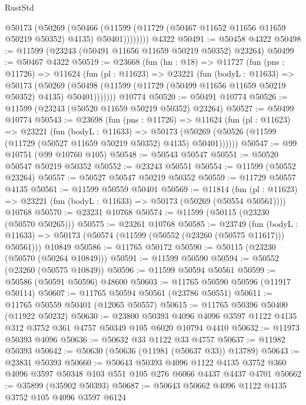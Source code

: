 \begin{lexlean}{RustStd}
\begin{coremodule}
            @50173
              (@50269
                (@50466
                  (@11599 (@11729 (@50467 @11652 @11656 @11659 @50219 @50352) @4135) @50401))))))))
    @4322
@50491 := @50458 @4322
@50498 := @11599 (@23243 (@50491 @11656 @11659 @50219 @50352) @23264)
@50499 := @50467 @4322
@50519 := @23668
    (fun (hn : @18) =>
    @11727
      (fun (pns : @11726) =>
      @11624
        (fun (pl : @11623) =>
        @23221
          (fun (bodyL : @11633) =>
          @50173
            (@50269
              (@50498 (@11599 (@11729 (@50499 @11656 @11659 @50219 @50352) @4135) @50401)))))))
    @10774
@50520 := @50491 @10774
@50526 := @11599 (@23243 (@50520 @11659 @50219 @50352) @23264)
@50527 := @50499 @10774
@50543 := @23698
    (fun (pns : @11726) =>
    @11624
      (fun (pl : @11623) =>
      @23221
        (fun (bodyL : @11633) =>
        @50173 (@50269 (@50526 (@11599 (@11729 (@50527 @11659 @50219 @50352) @4135) @50401))))))
@50547 := @99 @10751 (@99 @10760 @105)
@50548 := @50543 @50547
@50551 := @50520 @50547 @50219 @50352
@50552 := @23243 @50551
@50554 := @11599 (@50552 @23264)
@50557 := @50527 @50547 @50219 @50352
@50559 := @11729 @50557 @4135
@50561 := @11599 @50559 @50401
@50569 := @11814
    (fun (pl : @11623) => @23221 (fun (bodyL : @11633) => @50173 (@50269 (@50554 @50561))))
    @10768
@50570 := @23231 @10768
@50574 := @11599 (@50115 (@23230 (@50570 @50265)))
@50575 := @23261 @10768
@50585 := @23749
    (fun (bodyL : @11633) => @50173 (@50574 (@11599 (@50552 (@23260 (@50575 @11617))) @50561)))
    @10849
@50586 := @11765 @50172
@50590 := @50115 (@23230 (@50570 (@50264 @10849)))
@50591 := @11599 @50590
@50594 := @50552 (@23260 (@50575 @10849))
@50596 := @11599 @50594 @50561
@50599 := @50586 (@50591 @50596) @48600
@50603 := @11765 @50590 @50596 (@11917 @50114)
@50607 := @11765 @50594 @50561 (@23786 @50551)
@50611 := @11765 @50559 @50401 (@12065 @50557)
@50615 := @11765 @50396 @50400 (@11922 @50232)
@50630 := @23800
    @50393
    @4096
    @4096
    @3597
    @1122
    @4135
    @312
    @3752
    @361
    @4757
    @50349
    @105
    @6020
    @10794
    @4410
@50632 := @11973 @50393 @4096
@50636 := @50632 @33 @1122 @33 @4757
@50637 := @11982 @50393
@50642 := @50630 (@50636 (@11981 (@50637 @33)) @13789)
@50643 := @23831 @50393
@50660 := @50643
    @50393
    @4096
    @1122
    @4135
    @3752
    @360
    @4096
    @3597
    @50348
    @103
    @551
    @105
    @276
    @6066
    @4437
    @4437
    @4701
@50662 := @35899 (@35902 @50393)
@50687 := @50643
    @50662
    @4096
    @1122
    @4135
    @3752
    @105
    @4096
    @3597
    @6124

\end{coremodule}
\end{lexlean}
